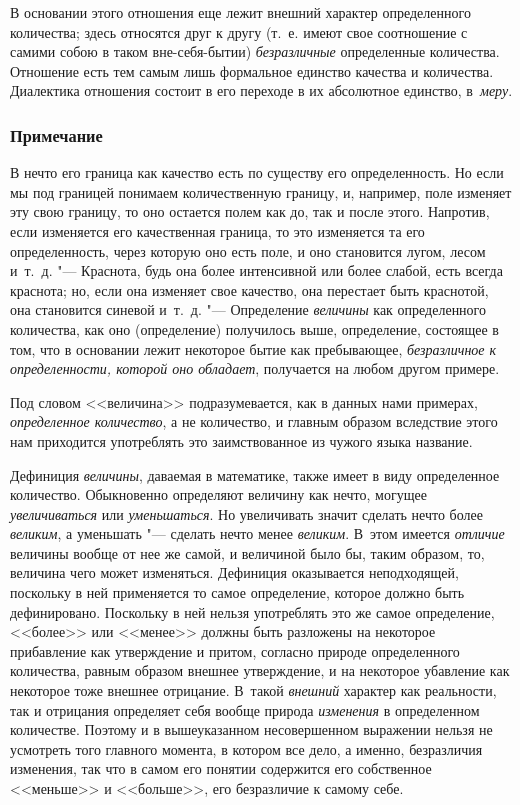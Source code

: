 В основании этого отношения еще лежит внешний характер определенного
количества; здесь относятся друг к другу (т.~е. имеют свое соотношение с
самими собою в таком вне-себя-бытии) {\em безразличные}
определенные количества. Отношение есть тем самым лишь формальное единство
качества и количества. Диалектика отношения состоит в его переходе в их
абсолютное единство, в~{\em меру}.

\subsubsection[Примечание]{Примечание}

В нечто его граница как качество есть по существу его определенность. Но
если мы под границей понимаем количественную границу, и, например, поле
изменяет эту свою границу, то оно остается полем как до, так и после этого.
Напротив, если изменяется его качественная граница, то это изменяется та
его определенность, через которую оно есть поле, и оно становится лугом,
лесом и~т.~д. "--- Краснота, будь она более интенсивной или более слабой, есть
всегда краснота; но, если она изменяет свое качество, она перестает быть
краснотой, она становится синевой и~т.~д. "--- Определение
{\em величины} как определенного количества, как оно
(определение) получилось выше, определение, состоящее в том, что в
основании лежит некоторое бытие как пребывающее,
{\em безразличное к определенности, которой оно
обладает}, получается на любом другом примере.

Под словом <<величина>> подразумевается, как в данных нами примерах,
{\em определенное количество}, а не количество, и
главным образом вследствие этого нам приходится употреблять это
заимствованное из чужого языка
название.

Дефиниция {\em величины}, даваемая в математике, также
имеет в виду определенное количество. Обыкновенно определяют величину как
нечто, могущее {\em увеличиваться} или
{\em уменьшаться}. Но увеличивать значит сделать нечто
более {\em великим}, а уменьшать "--- сделать нечто менее {\em великим}.
В~этом имеется {\em отличие} величины вообще от нее же самой, и
величиной было бы, таким образом, то, величина чего может изменяться.
Дефиниция оказывается неподходящей, поскольку в ней применяется то самое
определение, которое должно быть дефинировано. Поскольку в ней нельзя
употреблять это же самое определение, <<более>> или <<менее>> должны быть
разложены на некоторое прибавление как утверждение и притом, согласно
природе определенного количества, равным образом внешнее утверждение, и на
некоторое убавление как некоторое тоже внешнее отрицание. В~такой
{\em внешний} характер как реальности, так и отрицания
определяет себя вообще природа {\em изменения} в
определенном количестве. Поэтому и в вышеуказанном несовершенном выражении
нельзя не усмотреть того главного момента, в котором все дело, а именно,
безразличия изменения, так что в самом его понятии содержится его
собственное <<меньше>> и <<больше>>, его безразличие к самому себе.


